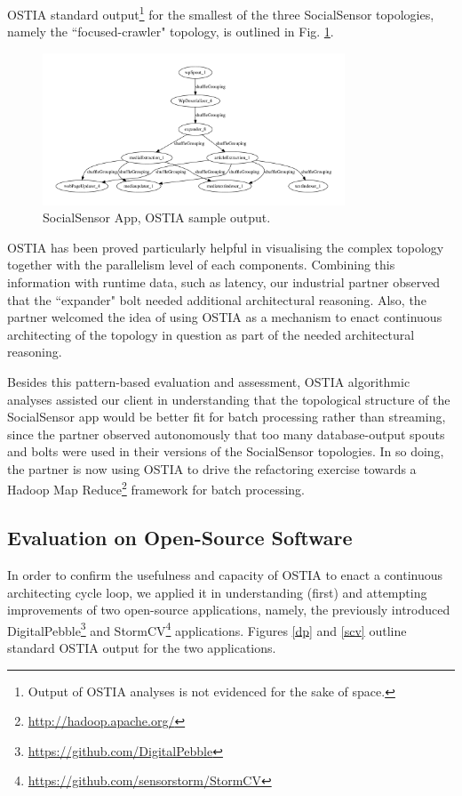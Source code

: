 OSTIA standard output\footnote{Output of OSTIA analyses is not evidenced for the
sake of space.} for the smallest of the three SocialSensor topologies, namely
the ``focused-crawler" topology, is outlined in Fig. \ref{topo1}.

\begin{figure}
		\includegraphics[width=9cm]{images/output/focused_crawler}
		\caption{SocialSensor App, OSTIA sample output.}
		\label{topo1}
\end{figure}

OSTIA has been proved particularly helpful in visualising the complex topology
together with the parallelism level of each components. Combining this
information with runtime data, such as latency, our industrial partner observed
that the ``expander" bolt needed additional architectural reasoning. Also, the
partner welcomed the idea of using OSTIA as a mechanism to enact continuous
architecting of the topology in question as part of the needed architectural
reasoning.

Besides this pattern-based evaluation and assessment, OSTIA algorithmic analyses
assisted our client in understanding that the topological structure of the
SocialSensor app would be better fit for batch processing rather than streaming,
since the partner observed autonomously that too many database-output spouts and
bolts were used in their versions of the SocialSensor topologies. In so doing,
the partner is now using OSTIA to drive the refactoring exercise towards a
Hadoop Map Reduce\footnote{\url{http://hadoop.apache.org/}} framework for batch
processing.

\subsection{Evaluation on Open-Source Software}\label{os}

In order to confirm the usefulness and capacity of OSTIA to enact a continuous
architecting cycle loop, we applied it in understanding (first) and attempting
improvements of two open-source applications, namely, the previously introduced
DigitalPebble\footnote{\url{https://github.com/DigitalPebble}} and
StormCV\footnote{\url{https://github.com/sensorstorm/StormCV}}
applications. Figures \ref{dp} and \ref{scv} outline standard OSTIA output for
the two applications.
%

